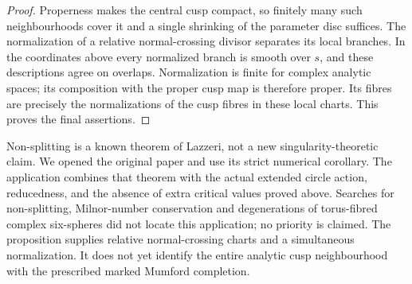 \begin{proof}
Properness makes the central cusp
compact, so finitely many such
neighbourhoods cover it and a
single shrinking of the parameter
disc suffices.  The normalization
of a relative normal-crossing
divisor separates its local
branches.  In the coordinates
above every normalized branch
is smooth over $s$, and these
descriptions agree on overlaps.
Normalization is finite for
complex analytic spaces; its
composition with the proper
cusp map is therefore proper.
Its fibres are precisely the
normalizations of the cusp
fibres in these local charts.
This proves the final assertions.
\end{proof}

\begin{remark}
Non-splitting is a known theorem of
Lazzeri, not a new singularity-theoretic
claim.  We opened the original paper
and use its strict numerical
corollary.  The application combines
that theorem with the actual extended
circle action, reducedness, and the
absence of extra critical values
proved above.  Searches for
non-splitting, Milnor-number
conservation and degenerations of
torus-fibred complex six-spheres
did not locate this application;
no priority is claimed.  The
proposition supplies relative
normal-crossing charts and a
simultaneous normalization.  It
does not yet identify the entire
analytic cusp neighbourhood with
the prescribed marked Mumford
completion.
\end{remark}
